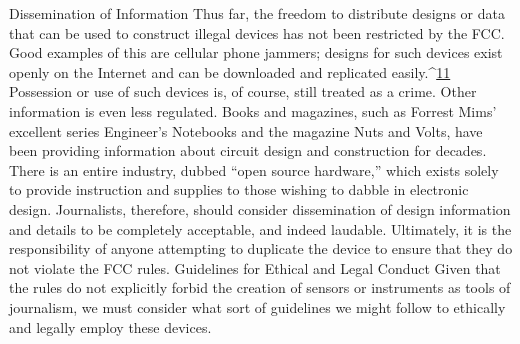 Dissemination of Information
Thus far, the freedom to distribute designs or data that can be used to construct
illegal devices has not been restricted by the FCC. Good examples of
this are cellular phone jammers; designs for such devices exist openly on the
Internet and can be downloaded and replicated easily.^{\href{#endnotes-hord}{11}} Possession or use of
such devices is, of course, still treated as a crime.
Other information is even less regulated. Books and magazines, such as
Forrest Mims' excellent series Engineer's Notebooks and the magazine Nuts
and Volts, have been providing information about circuit design and construction
for decades. There is an entire industry, dubbed ``open source
hardware,'' which exists solely to provide instruction and supplies to those
wishing to dabble in electronic design.
Journalists, therefore, should consider dissemination of design information
and details to be completely acceptable, and indeed laudable. Ultimately, it
is the responsibility of anyone attempting to duplicate the device to ensure
that they do not violate the FCC rules.
Guidelines for Ethical and Legal Conduct
Given that the rules do not explicitly forbid the creation of sensors or instruments
as tools of journalism, we must consider what sort of guidelines we
might follow to ethically and legally employ these devices.
